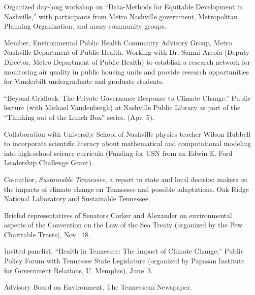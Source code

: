\item[2018] Organized day-long workshop on ``Data-Methods for Equitable
  Development in Nashville,'' with participants from Metro Nashville
  government, Metropolitan Planning Organization,
  and many community groups.
\item[2017--present] Member, Environmental Public Health Community Advisory
  Group, Metro Nashville Department of Public Health. Working with Dr. Sanmi
  Areola (Deputy Director, Metro Department of Public Health)
  to establish a research network for monitoring air quality in public housing
  units and provide research opportunities for Vanderbilt undergraduate and
  graduate students.
\item[2017] ``Beyond Gridlock: The Private Governance Response to Climate
  Change.'' Public lecture (with Michael Vandenbergh) at Nashville Public
  Library as part of the ``Thinking out of the Lunch Box'' series. (Apr. 5).
\item[2015--2017] Collaboration with University School of Nashville physics
  teacher Wilson Hubbell to incorporate scientific literacy about mathematical
  and computational modeling into high-school science curricula (Funding for
  USN from an Edwin E. Ford Leadership Challenge Grant).
\item[2011--2012] Co-author, \emph{Sustainable Tennessee}, a report to state
  and local decision makers on the impacts of climate change on Tennessee and
  possible adaptations. Oak Ridge National Laboratory and Sustainable Tennessee.
\item[2009] Briefed representatives of Senators Corker and Alexander on
  environmental aspects of the Convention on the Law of the Sea Treaty
  (organized by the Pew Charitable Trusts), Nov.~18.
\item[2009] Invited panelist, ``Health in Tennessee: The Impact of Climate
  Change,'' Public Policy Forum with Tennessee State Legislature (organized by
  Papasan Institute for Government Relations, U. Memphis), June~3.
\item[2007--2009] Advisory Board on Environment, The Tennessean Newspaper.
